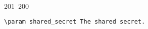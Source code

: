 201~200~\documentclass{article}
\begin{document}
\begin{lstlisting}[language=Python, caption=Key Derivation with HKDF]
	                                                                                                                                                                                                                                                                                                	                                                                                                                                        	    	                                                                                                	                                                                                                                                                                                                                                                                                                                                	                                                                        	                                                            \param shared_secret The shared secret.
	                                                                                                                                                                                                                                                                                                	                                                                                                                                        	    	                                                                                                	                                                                                                                                                                                                                                                                                                                                	                                                                        	                                                                \return The derived encryption key.
	                                                                                                                                                                                                                                                                                                	                                                                                                                                        	    	                                                                                                	                                                                                                                                                                                                                                                                                                                                	                                                                        	                                                                    """

\end{lstlisting}
\end{document}
